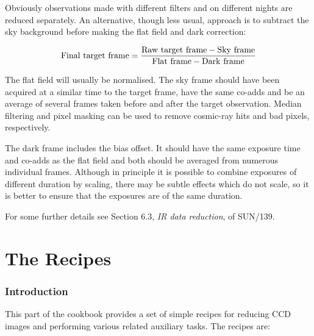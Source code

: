 \documentclass[twoside,11pt]{article}
\newcommand{\stardocinitials}  {SC}
\newcommand{\stardocnumber}    {5.3}
\newcommand{\stardocname}{\stardocinitials /\stardocnumber}
\newcommand{\xref}[3]{#1}
\newcommand{\xlabel}[1]{}
\begin{document}
Obviously observations made with different filters and on different nights
are reduced separately.  An alternative, though less usual, approach is to
subtract the sky background before making the flat field and dark
correction:

\begin{equation}
{\rm Final~target~frame} =
\frac {{\rm Raw~target~frame} - {\rm Sky~frame}}
{{\rm Flat~frame} - {\rm Dark~frame}}
\end{equation}

The flat field will usually be normalised.  The sky frame should have
been acquired at a similar time to the target frame, have the same co-adds
and be an average of several frames taken before and after the target
observation.  Median filtering and pixel masking can be used to remove
cosmic-ray hits and bad pixels, respectively.

The dark frame includes the bias offset.  It should have the same exposure
time and co-adds as the flat field and both should be averaged from
numerous individual frames.  Although in  principle it is possible to
combine exposures of different duration by scaling, there may be subtle
effects which do not scale, so it is better to ensure that the exposures
are of the same duration.

For some further details see
\xref{Section 6.3, {\it IR data reduction}}{sun139}{IRreduction},
of \xref{SUN/139}{sun139}{}\/\cite{SUN139}.


\cleardoublepage
\markboth{\stardocname}{\stardocname}
\part{The Recipes}
\markboth{\stardocname}{\stardocname}
\section{\xlabel{SUMEX}\label{SUMEX}Introduction}

This part of the cookbook provides a set of simple recipes for reducing
CCD images and performing various related auxiliary tasks.  The
recipes are:
\end{document}
